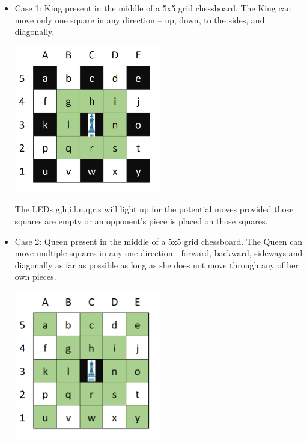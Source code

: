 \documentclass[12pt, titlepage]{article}
\begin{document}
  \begin{itemize}
    \item Case 1: King present in the middle of a 5x5 grid chessboard. The King can move only one square in any direction – up, down, to the sides, and diagonally.

    \begin{minipage}{\linewidth}
      \centering
      \includegraphics[width=0.5\textwidth]{king}
  \end{minipage}

  The LEDs g,h,i,l,n,q,r,s will light up for the potential moves provided those squares are empty or an opponent’s piece is placed on those squares.

    \item Case 2: Queen present in the middle of a 5x5 grid chessboard. The Queen can move multiple squares in any one direction - forward, backward, sideways and 
    diagonally as far as possible as long as she does not move through any of her own pieces.

    \begin{minipage}{\linewidth}
      \centering
      \includegraphics[width=0.5\textwidth]{queen}
  \end{minipage}


\end{itemize}
\end{document}
